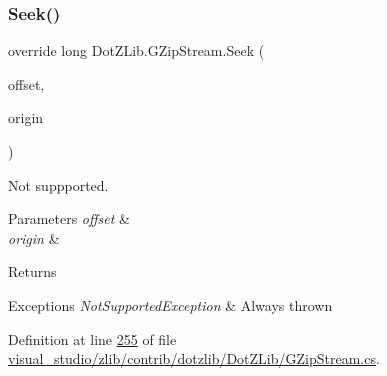 \mbox{\label{class_dot_z_lib_1_1_g_zip_stream_adbb50684c05ca060cff804c91c63f4a2}} 
\subsubsection{\texorpdfstring{Seek()}{Seek()}\hspace{0.1cm}{\footnotesize\ttfamily [2/2]}}
{\footnotesize\ttfamily override long Dot\+Z\+Lib.\+G\+Zip\+Stream.\+Seek (\begin{DoxyParamCaption}\item[{long}]{offset,  }\item[{Seek\+Origin}]{origin }\end{DoxyParamCaption})\hspace{0.3cm}{\ttfamily [inline]}}



Not suppported. 


\begin{DoxyParams}{Parameters}
{\em offset} & \\
\hline
{\em origin} & \\
\hline
\end{DoxyParams}
\begin{DoxyReturn}{Returns}

\end{DoxyReturn}

\begin{DoxyExceptions}{Exceptions}
{\em Not\+Supported\+Exception} & Always thrown\\
\hline
\end{DoxyExceptions}


Definition at line \hyperlink{visual__studio_2zlib_2contrib_2dotzlib_2_dot_z_lib_2_g_zip_stream_8cs_source_l00255}{255} of file \hyperlink{visual__studio_2zlib_2contrib_2dotzlib_2_dot_z_lib_2_g_zip_stream_8cs_source}{visual\+\_\+studio/zlib/contrib/dotzlib/\+Dot\+Z\+Lib/\+G\+Zip\+Stream.\+cs}.

\mbox{\label{class_dot_z_lib_1_1_g_zip_stream_a05fff98b765251f87b41318781da71c4}} 
